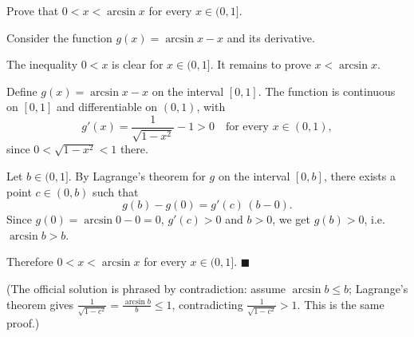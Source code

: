 
\begin{question}
Prove that $0<x<\arcsin x$ for every $x\in(0,1]$.
\end{question}

\begin{hint}
Consider the function $g(x)=\arcsin x-x$ and its derivative.
\end{hint}

\begin{solution}
The inequality $0<x$ is clear for $x\in(0,1]$. It remains to prove $x<\arcsin x$.

Define $g(x)=\arcsin x-x$ on the interval $[0,1]$. The function is continuous on $[0,1]$ and differentiable on $(0,1)$, with
\[ g'(x)=\frac{1}{\sqrt{1-x^2}}-1>0 \quad\text{for every } x\in(0,1), \]
since $0<\sqrt{1-x^2}<1$ there.

Let $b\in(0,1]$. By Lagrange's theorem for $g$ on the interval $[0,b]$, there exists a point $c\in(0,b)$ such that
\[ g(b)-g(0)=g'(c)\,(b-0). \]
Since $g(0)=\arcsin0-0=0$, $g'(c)>0$ and $b>0$, we get $g(b)>0$, i.e. $\arcsin b>b$.

Therefore $0<x<\arcsin x$ for every $x\in(0,1]$. $\blacksquare$

(The official solution is phrased by contradiction: assume $\arcsin b\le b$; Lagrange's theorem gives $\frac{1}{\sqrt{1-c^2}}=\frac{\arcsin b}{b}\le1$, contradicting $\frac{1}{\sqrt{1-c^2}}>1$. This is the same proof.)
\end{solution}

